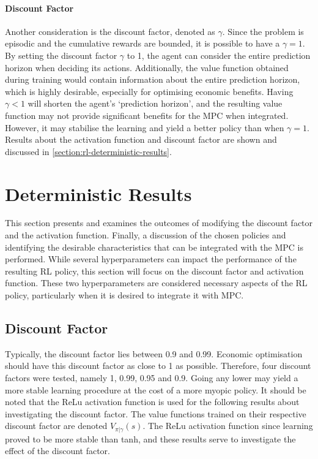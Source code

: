 \paragraph{Discount Factor} 
Another consideration is the discount factor, denoted as $\gamma$. Since the problem is episodic and the cumulative rewards are bounded, it is possible to have a $\gamma = 1$. By setting the discount factor $\gamma$ to 1, the agent can consider the entire prediction horizon when deciding its actions. Additionally, the value function obtained during training would contain information about the entire prediction horizon, which is highly desirable, especially for optimising economic benefits. Having $\gamma < 1$ will shorten the agent’s ‘prediction horizon’, and the resulting value function may not provide significant benefits for the MPC when integrated. However, it may stabilise the learning and yield a better policy than when $\gamma = 1$. Results about the activation function and discount factor are shown and discussed in \autoref{section:rl-deterministic-results}.

\section{Deterministic Results}
This section presents and examines the outcomes of modifying the discount factor and the activation function. Finally, a discussion of the chosen policies and identifying the desirable characteristics that can be integrated with the MPC is performed. While several hyperparameters can impact the performance of the resulting RL policy, this section will focus on the discount factor and activation function. These two hyperparameters are considered necessary aspects of the RL policy, particularly when it is desired to integrate it with MPC.

\subsection{Discount Factor}\label{ssection:discount-factor}
Typically, the discount factor lies between 0.9 and 0.99. Economic optimisation should have this discount factor as close to 1 as possible. Therefore, four discount factors were tested, namely 1, 0.99, 0.95 and 0.9. Going any lower may yield a more stable learning procedure at the cost of a more myopic policy. It should be noted that the ReLu activation function is used for the following results about investigating the discount factor. The value functions trained on their respective discount factor are denoted $V_{\pi|\gamma}(s)$. The ReLu activation function since learning proved to be more stable than tanh, and these results serve to investigate the effect of the discount factor.

